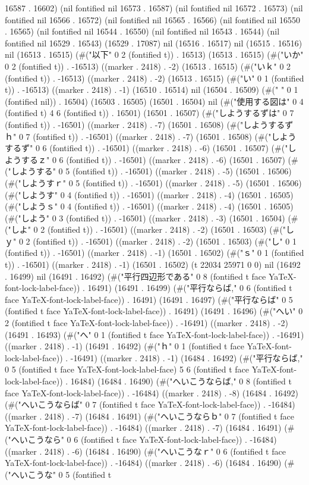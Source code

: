 16587 . 16602) (nil fontified nil 16573 . 16587) (nil fontified nil 16572 . 16573) (nil fontified nil 16566 . 16572) (nil fontified nil 16565 . 16566) (nil fontified nil 16550 . 16565) (nil fontified nil 16544 . 16550) (nil fontified nil 16543 . 16544) (nil fontified nil 16529 . 16543) (16529 . 17087) nil (16516 . 16517) nil (16515 . 16516) nil (16513 . 16515) (#("以下" 0 2 (fontified t)) . 16513) (16513 . 16515) (#("いか" 0 2 (fontified t)) . -16513) ((marker . 2418) . -2) (16513 . 16515) (#("いｋ" 0 2 (fontified t)) . -16513) ((marker . 2418) . -2) (16513 . 16515) (#("い" 0 1 (fontified t)) . -16513) ((marker . 2418) . -1) (16510 . 16514) nil (16504 . 16509) (#("	" 0 1 (fontified nil)) . 16504) (16503 . 16505) (16501 . 16504) nil (#("使用する図は" 0 4 (fontified t) 4 6 (fontified t)) . 16501) (16501 . 16507) (#("しようするずは" 0 7 (fontified t)) . -16501) ((marker . 2418) . -7) (16501 . 16508) (#("しようするずｈ" 0 7 (fontified t)) . -16501) ((marker . 2418) . -7) (16501 . 16508) (#("しようするず" 0 6 (fontified t)) . -16501) ((marker . 2418) . -6) (16501 . 16507) (#("しようするｚ" 0 6 (fontified t)) . -16501) ((marker . 2418) . -6) (16501 . 16507) (#("しようする" 0 5 (fontified t)) . -16501) ((marker . 2418) . -5) (16501 . 16506) (#("しようすｒ" 0 5 (fontified t)) . -16501) ((marker . 2418) . -5) (16501 . 16506) (#("しようす" 0 4 (fontified t)) . -16501) ((marker . 2418) . -4) (16501 . 16505) (#("しようｓ" 0 4 (fontified t)) . -16501) ((marker . 2418) . -4) (16501 . 16505) (#("しよう" 0 3 (fontified t)) . -16501) ((marker . 2418) . -3) (16501 . 16504) (#("しよ" 0 2 (fontified t)) . -16501) ((marker . 2418) . -2) (16501 . 16503) (#("しｙ" 0 2 (fontified t)) . -16501) ((marker . 2418) . -2) (16501 . 16503) (#("し" 0 1 (fontified t)) . -16501) ((marker . 2418) . -1) (16501 . 16502) (#("ｓ" 0 1 (fontified t)) . -16501) ((marker . 2418) . -1) (16501 . 16502) (t 22034 25971 0 0) nil (16492 . 16499) nil (16491 . 16492) (#("平行四辺形である" 0 8 (fontified t face YaTeX-font-lock-label-face)) . 16491) (16491 . 16499) (#("平行ならば," 0 6 (fontified t face YaTeX-font-lock-label-face)) . 16491) (16491 . 16497) (#("平行ならば" 0 5 (fontified t face YaTeX-font-lock-label-face)) . 16491) (16491 . 16496) (#("へい" 0 2 (fontified t face YaTeX-font-lock-label-face)) . -16491) ((marker . 2418) . -2) (16491 . 16493) (#("へ" 0 1 (fontified t face YaTeX-font-lock-label-face)) . -16491) ((marker . 2418) . -1) (16491 . 16492) (#("ｈ" 0 1 (fontified t face YaTeX-font-lock-label-face)) . -16491) ((marker . 2418) . -1) (16484 . 16492) (#("平行ならば," 0 5 (fontified t face YaTeX-font-lock-label-face) 5 6 (fontified t face YaTeX-font-lock-label-face)) . 16484) (16484 . 16490) (#("へいこうならば," 0 8 (fontified t face YaTeX-font-lock-label-face)) . -16484) ((marker . 2418) . -8) (16484 . 16492) (#("へいこうならば" 0 7 (fontified t face YaTeX-font-lock-label-face)) . -16484) ((marker . 2418) . -7) (16484 . 16491) (#("へいこうならｂ" 0 7 (fontified t face YaTeX-font-lock-label-face)) . -16484) ((marker . 2418) . -7) (16484 . 16491) (#("へいこうなら" 0 6 (fontified t face YaTeX-font-lock-label-face)) . -16484) ((marker . 2418) . -6) (16484 . 16490) (#("へいこうなｒ" 0 6 (fontified t face YaTeX-font-lock-label-face)) . -16484) ((marker . 2418) . -6) (16484 . 16490) (#("へいこうな" 0 5 (fontified t 